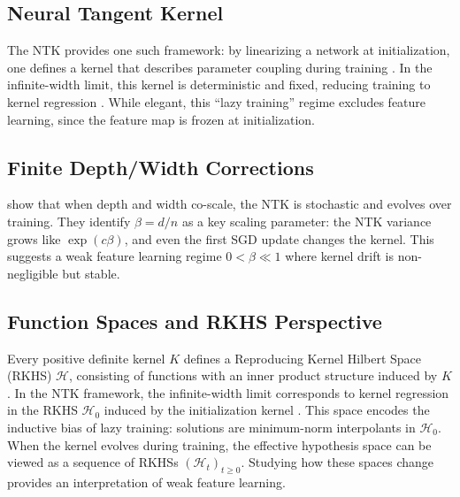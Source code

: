 \documentclass[11pt,a4paper]{article}
\begin{document}
\subsection{Neural Tangent Kernel}
The NTK provides one such framework: by linearizing a network at
initialization, one defines a kernel that describes parameter coupling during
training \citep{jacot2018ntk}. In the infinite-width limit, this kernel is
deterministic and fixed, reducing training to kernel regression
\citep{lee2020wide}. While elegant, this ``lazy training'' regime excludes
feature learning, since the feature map is frozen at initialization.

\subsection{Finite Depth/Width Corrections}
\citet{haninNica2019finite} show that when depth and width co-scale, the NTK is
stochastic and evolves over training. They identify $\beta = d/n$ as a key
scaling parameter: the NTK variance grows like $\exp(c\beta)$, and even the
first SGD update changes the kernel. This suggests a weak feature learning
regime $0<\beta\ll 1$ where kernel drift is non-negligible but stable.

\subsection{Function Spaces and RKHS Perspective}
Every positive definite kernel $K$ defines a Reproducing Kernel Hilbert Space
(RKHS) $\mathcal H$, consisting of functions with an inner product structure
induced by $K$. In the NTK framework, the infinite-width limit corresponds to
kernel regression in the RKHS $\mathcal H_0$ induced by the initialization
kernel \citep{jacot2018ntk,bartolucci2023rkbs}. This space encodes the inductive bias of lazy
training: solutions are minimum-norm interpolants in $\mathcal H_0$. When the
kernel evolves during training, the effective hypothesis space can be viewed as
a sequence of RKHSs $(\mathcal H_t)_{t\geq0}$. Studying how these spaces change
provides an interpretation of weak feature learning.

\end{document}
